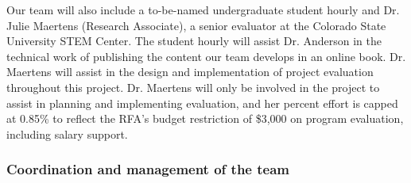 \documentclass[pdftex,english,11pt,parskip=half]{scrartcl}
\begin{document}
\noindent Our team will also include a to-be-named undergraduate student hourly and Dr. Julie Maertens (Research Associate), a senior evaluator
at the Colorado State University STEM Center. The student hourly will assist Dr. Anderson
in the technical work of publishing the content our team develops in an online book. 
Dr. Maertens will assist in the design and
implementation of project evaluation throughout this project. Dr. Maertens will
only be involved in the project to assist in planning and implementing
evaluation, and her percent effort is capped at 0.85\% to reflect the RFA's
budget restriction of \$3,000 on program evaluation, including salary
support.

\subsubsection*{Coordination and management of the team}


\end{document}
